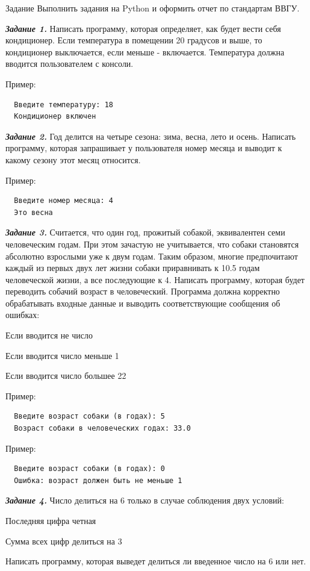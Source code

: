 \documentclass[]{vvsu}
\begin{document}
\begin{addition}{Задание}
  Выполнить задания на Python и оформить отчет по стандартам ВВГУ.

  \textit{\textbf{Задание 1.}}  
  Написать программу, которая определяет, как будет вести себя кондиционер. Если температура в помещении 20 градусов и выше, то кондиционер выключается, если меньше - включается. Температура должна вводится пользователем с консоли.

  Пример:
  \begin{verbatim}
  Введите температуру: 18
  Кондиционер включен\end{verbatim}

  \textit{\textbf{Задание 2.}}  
  Год делится на четыре сезона: зима, весна, лето и осень. Написать программу, которая запрашивает у пользователя номер месяца и выводит к какому сезону этот месяц относится.

  Пример:
  \begin{verbatim}
  Введите номер месяца: 4
  Это весна\end{verbatim}
  
  \textit{\textbf{Задание 3.}}  
  Считается, что один год, прожитый собакой, эквивалентен семи человеческим годам. При этом зачастую не учитывается, что собаки становятся абсолютно взрослыми уже к двум годам. Таким образом, многие предпочитают каждый из первых двух лет жизни собаки приравнивать к 10.5 годам человеческой жизни, а все последующие к 4.
  Написать программу, которая будет переводить собачий возраст в человеческий. Программа должна корректно обрабатывать входные данные и выводить соответствующие сообщения об ошибках:
  \begin{vvsu_list}
    \item Если вводится не число
    \item Если вводится число меньше 1
    \item Если вводится число большее 22
  \end{vvsu_list}
  Пример:
  \begin{verbatim}
  Введите возраст собаки (в годах): 5
  Возраст собаки в человеческих годах: 33.0\end{verbatim}
  Пример:
  \begin{verbatim}
  Введите возраст собаки (в годах): 0  
  Ошибка: возраст должен быть не меньше 1\end{verbatim}

  \textit{\textbf{Задание 4.}}  
  Число делиться на 6 только в случае соблюдения двух условий:
  \begin{vvsu_list}
    \item Последняя цифра четная
    \item Сумма всех цифр делиться на 3
  \end{vvsu_list}
  Написать программу, которая выведет делиться ли введенное число на 6 или нет.


\end{addition}
\end{document}
